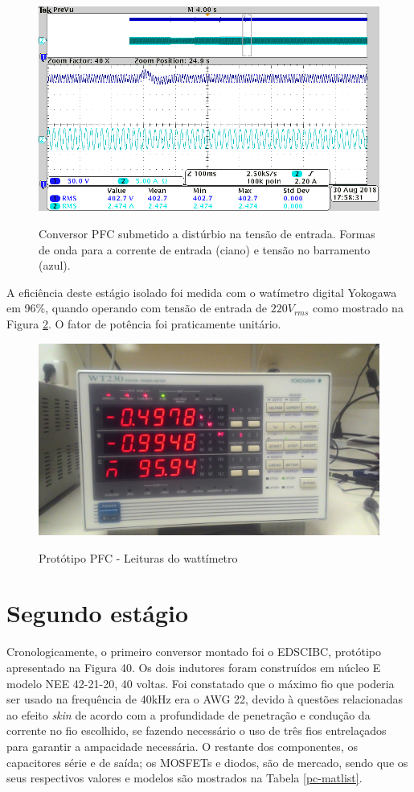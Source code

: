 \documentclass[
        12pt,
        openany, %
        oneside, %
        a4paper,			
        english,			
        brazil
        ]{abntbibufjf}
\begin{document}
\begin{figure}[!h]
	\centering
	\caption{Conversor PFC submetido a distúrbio na tensão de entrada. Formas de onda para a corrente de entrada (ciano) e tensão no barramento (azul).}
	\includegraphics[width=0.7\linewidth]{../GRAFICOS/TEK/tek00058}
	\label{o_pfc_ctrl}
\end{figure}


A eficiência deste estágio isolado foi medida com o watímetro digital Yokogawa em 96\%, quando operando com tensão de entrada de $220V_{rms}$ como mostrado na Figura \ref{yoko}. O fator de potência foi praticamente unitário.

\begin{figure}[!h]
	\centering
	\caption{Protótipo PFC - Leituras do wattímetro}
	\includegraphics[scale=.05]{../FOTOGRAFIAS/P_20180830_175245.jpg}\\
	\label{yoko}
\end{figure}


\section{Segundo estágio}

Cronologicamente, o primeiro conversor montado foi o EDSCIBC, protótipo apresentado na Figura 40. Os dois indutores foram construídos em núcleo E modelo NEE 42-21-20, 40 voltas. Foi constatado que o máximo fio que poderia ser usado na frequência de 40kHz era o AWG 22, devido à questões relacionadas ao efeito \textit{skin} de acordo com a profundidade de penetração e condução da corrente no fio escolhido, se fazendo necessário o uso de três fios entrelaçados para garantir a ampacidade necessária. O restante dos componentes, os capacitores série e de saída; os MOSFETs e diodos, são de mercado, sendo que os seus respectivos valores e modelos são mostrados na Tabela \ref{pc-matlist}.
\end{document}
